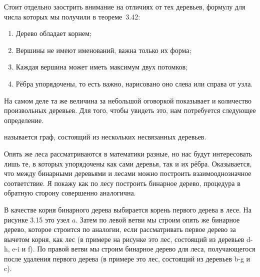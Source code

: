Стоит отдельно заострить внимание на отличиях от тех деревьев, формулу для числа которых мы получили в теореме~3.42:
\begin{enumerate}
\item Дерево обладает корнем;
\item Вершины не имеют именований, важна только их форма;
\item Каждая вершина может иметь максимум двух потомков;
\item Рёбра упорядочены, то есть важно, нарисовано оно слева или справа от узла.
\end{enumerate}

На самом деле та же величина за небольшой оговоркой показывает и количество произвольных деревьев. Для того, чтобы увидеть это, нам потребуется следующее определение.

\begin{definition}
 называется граф, состоящий из нескольких несвязанных деревьев.
\end{definition}

Опять же леса рассматриваются в математики разные, но нас будут интересовать лишь те, в которых упорядочены как сами деревья, так и их рёбра. Оказывается, что между бинарными деревьями и лесами можно построить взаимооднозначное соответствие. Я покажу как по лесу построить бинарное дерево, процедура в обратную сторону совершенно аналогична.

В качестве корня бинарного дерева выбирается корень первого дерева в лесе. На рисунке 3.15 это узел $a$. Затем по левой ветви мы строим опять же бинарное дерево, которое строится по аналогии, если рассматривать первое дерево за вычетом корня, как лес (в примере на рисунке это лес, состоящий из деревьев d-h, e-i и f). По правой ветви мы строим бинарное дерево для леса, получающегося после удаления первого дерева (в примере это лес, состоящий из деревьев b-g и c).

